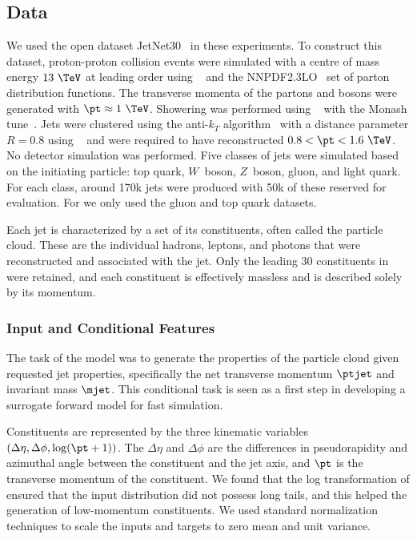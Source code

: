 \subsection{Data}
\label{sec:jetgen_data}

We used the open dataset JetNet30~\cite{MPGAN} in these experiments.
To construct this dataset, proton-proton collision events were simulated with a centre of mass energy $13~\TeV$ at leading order using \madgraph~\cite{MadGraph} and the \textsc{NNPDF2.3LO}~\cite{PDF2.3} set of parton distribution functions.
The transverse momenta of the partons and bosons were generated with $\pt \approx 1~\TeV$.
Showering was performed using ~\cite{Pythia8} with the Monash tune~\cite{Monash}.
Jets were clustered using the anti-$k_T$ algorithm~\cite{AntiKt} with a distance parameter $R=0.8$ using \fastjet~\cite{FastJet} and were required to have reconstructed $0.8 < \pt < 1.6~\TeV$.
No detector simulation was performed.
Five classes of jets were simulated based on the initiating particle: top quark, $W$~boson, $Z$~boson, gluon, and light quark.
For each class, around 170k jets were produced with 50k of these reserved for evaluation.
For \pcjedi we only used the gluon and top quark datasets.

Each jet is characterized by a set of its constituents, often called the particle cloud.
These are the individual hadrons, leptons, and photons that were reconstructed and associated with the jet.
Only the leading 30 constituents in \pt were retained, and each constituent is effectively massless and is described solely by its momentum.

\subsubsection{Input and Conditional Features}

The task of the model was to generate the properties of the particle cloud given requested jet properties, specifically the net transverse momentum $\ptjet$ and invariant mass $\mjet$.
This conditional task is seen as a first step in developing a surrogate forward model for fast simulation.

Constituents are represented by the three kinematic variables $\left(\Delta\eta, \Delta\phi, \log(\pt + 1)\right)$.
The $\Delta\eta$ and $\Delta\phi$ are the differences in pseudorapidity and azimuthal angle between the constituent and the jet axis, and $\pt$ is the transverse momentum of the constituent.
We found that the log transformation of \pt ensured that the input distribution did not possess long tails, and this helped the generation of low-momentum constituents.
We used standard normalization techniques to scale the inputs and targets to zero mean and unit variance.

